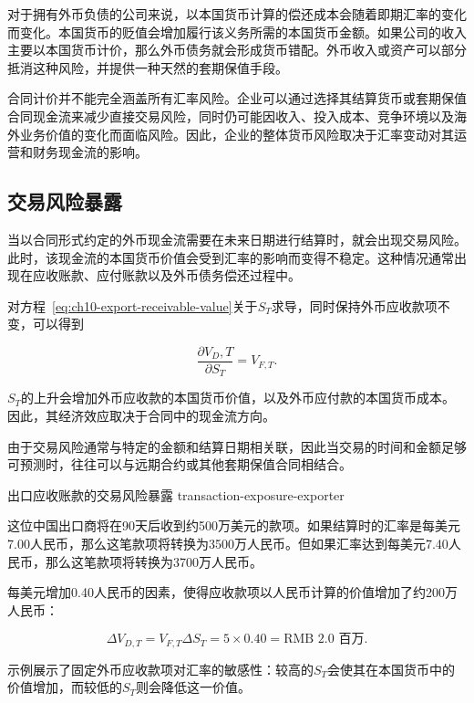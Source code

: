 对于拥有外币负债的公司来说，以本国货币计算的偿还成本会随着即期汇率的变化而变化。本国货币的贬值会增加履行该义务所需的本国货币金额。如果公司的收入主要以本国货币计价，那么外币债务就会形成货币错配。外币收入或资产可以部分抵消这种风险，并提供一种天然的套期保值手段。

合同计价并不能完全涵盖所有汇率风险。企业可以通过选择其结算货币或套期保值合同现金流来减少直接交易风险，同时仍可能因收入、投入成本、竞争环境以及海外业务价值的变化而面临风险。因此，企业的整体货币风险取决于汇率变动对其运营和财务现金流的影响。


\subsection{交易风险暴露}

当以合同形式约定的外币现金流需要在未来日期进行结算时，就会出现交易风险。此时，该现金流的本国货币价值会受到汇率的影响而变得不稳定。这种情况通常出现在应收账款、应付账款以及外币债务偿还过程中。

对方程~\eqref{eq:ch10-export-receivable-value}关于$S_T$求导，同时保持外币应收款项不变，可以得到

\begin{equation}
\frac{\partial V_D,T}{\partial S_T}=V_{F,T}.
\label{eq:ch10-transaction-exposure-sensitivity}
\end{equation}

$S_T$的上升会增加外币应收款的本国货币价值，以及外币应付款的本国货币成本。因此，其经济效应取决于合同中的现金流方向。

由于交易风险通常与特定的金额和结算日期相关联，因此当交易的时间和金额足够可预测时，往往可以与远期合约或其他套期保值合同相结合。

\begin{example}{出口应收账款的交易风险暴露}
{transaction-exposure-exporter}

这位中国出口商将在90天后收到约500万美元的款项。如果结算时的汇率是每美元7.00人民币，那么这笔款项将转换为3500万人民币。但如果汇率达到每美元7.40人民币，那么这笔款项将转换为3700万人民币。

每美元增加0.40人民币的因素，使得应收款项以人民币计算的价值增加了约200万人民币：

\[
\Delta V_{D,T}
=
V_{F,T}\Delta S_T
=
5\times 0.40
=
\text{RMB }2.0\text{ 百万}.
\]

示例展示了固定外币应收款项对汇率的敏感性：较高的$S_T$会使其在本国货币中的价值增加，而较低的$S_T$则会降低这一价值。

\end{example}


